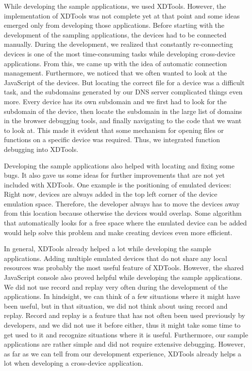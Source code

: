 While developing the sample applications, we used XDTools. However, the implementation of XDTools was not complete yet at that point and some ideas emerged only from developing those applications. Before starting with the development of the sampling applications, the devices had to be connected manually. During the development, we realized that constantly re-connecting devices is one of the most time-consuming tasks while developing cross-device applications. From this, we came up with the idea of automatic connection management. Furthermore, we noticed that we often wanted to look at the JavaScript of the devices. But locating the correct file for a device was a difficult task, and the subdomains generated by our DNS server complicated things even more. Every device has its own subdomain and we first had to look for the subdomain of the device, then locate the subdomain in the large list of domains in the browser debugging tools, and finally navigating to the code that we want to look at. This made it evident that some mechanism for opening files or functions on a specific device was required. Thus, we integrated function debugging into XDTools. 

Developing the sample applications also helped with locating and fixing some bugs. It also gave us some ideas for further improvements that are not yet included with XDTools. One example is the positioning of emulated devices: Right now, devices are always added in the top left corner of the device emulation space. Therefore, the developer always has to move the devices away from this location because otherwise the devices would overlap. Some algorithm that automatically looks for a free space where the emulated device can be added would help solve this problem and make creating devices even more efficient.

In general, XDTools already helped a lot while developing the sample applications. Adding multiple emulated devices that do not share any local resources was probably the most useful feature of XDTools. However, the shared JavaScript console also proved helpful while developing the sample applications. We did not use record and replay very often during the development of the applications. In hindsight, we can think of a few situations where it might have been useful, but in that situation, we did not think about using record and replay. Record and replay is a feature that has not often been used previously by developers, and we did not use it before either, thus it might take some time to get used to it and recognize situations where it is useful. Furthermore, our sample applications are rather simple and did not require extensive debugging. However, as far as we can tell from our development experience, XDTools already helps a lot when developing a cross-device application.